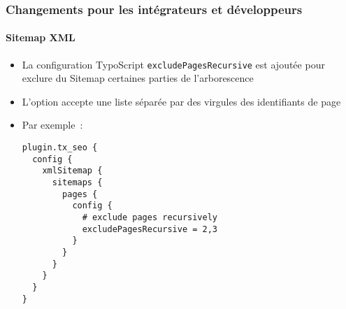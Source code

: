 %

\begin{frame}[fragile]
	\frametitle{Changements pour les intégrateurs et développeurs}
	\framesubtitle{Sitemap XML}


	\begin{itemize}
		\item La configuration TypoScript \texttt{excludePagesRecursive}
			est ajoutée pour exclure du Sitemap certaines parties de l'arborescence
		\item L'option accepte une liste séparée par des virgules des identifiants de page
		\item Par exemple~:
\begin{lstlisting}
plugin.tx_seo {
  config {
    xmlSitemap {
      sitemaps {
        pages {
          config {
            # exclude pages recursively
            excludePagesRecursive = 2,3
          }
        }
      }
    }
  }
}
\end{lstlisting}

	\end{itemize}

\end{frame}

